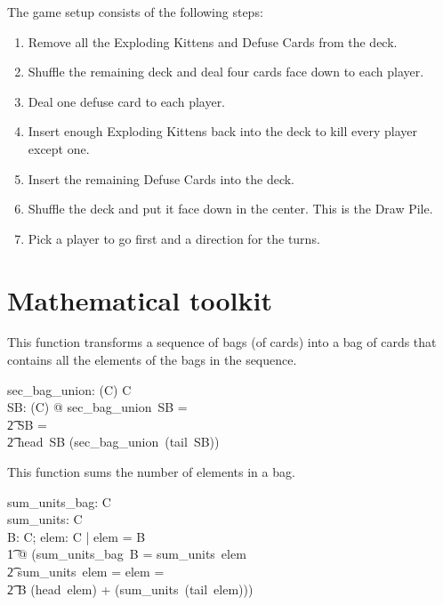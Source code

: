 \documentclass[11pt, fuzz]{article}
\begin{document}
The game setup consists of the following steps:

\begin{enumerate}
    \item Remove all the Exploding Kittens and Defuse Cards from the deck. 
    \item Shuffle the remaining deck and deal four cards face down to each player.
    \item Deal one defuse card to each player. 
    \item Insert enough Exploding Kittens back into the deck to kill every player except one. 
    \item Insert the remaining Defuse Cards into the deck. 
    \item Shuffle the deck and put it face down in the center. This is the Draw Pile. 
    \item Pick a player to go first and a direction for the turns. 
\end{enumerate}


\section{Mathematical toolkit}

This function transforms a sequence of bags (of cards) into a bag of cards that contains all the elements of the bags in the sequence. 

\begin{gendef}[C]
    sec\_bag\_union: \seq (\bag C) \fun \bag C\\
\where
    \forall SB: \seq (\bag C) @ sec\_bag\_union~SB = \\
\t2    \IF SB = \emptyset \THEN \lbag~\rbag\\
\t2    \ELSE head~SB \uplus (sec\_bag\_union~(tail~SB))
\end{gendef}

This function sums the number of elements in a bag. 

\begin{gendef}[C]
    sum\_units\_bag: \bag C \fun \nat\\
    sum\_units: \seq C \fun \nat\\
\where
    \forall B: \bag C; elem: \seq C | \ran elem = \dom B\\
    \t1 @ (sum\_units\_bag~B = sum\_units~elem \land\\
    \t2 sum\_units~elem = \IF elem = \emptyset {}\\
    \t2 \ELSE B \bcount (head~elem) + (sum\_units~(tail~elem)))
\end{gendef}
\end{document}

